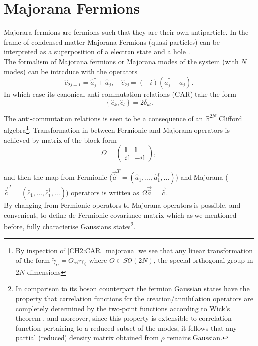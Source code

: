 \section{Majorana Fermions}
Majorara fermions are fermions such that they are their own antiparticle. In the frame of condensed matter Majorana Fermions (quasi-particles) can be interpreted as a superposition of a electron state and a hole \cite{leijnse_introduction_2012}.
\\
The formalism of Majorana fermions or Majorana modes of the system (with $N$ modes) can be introduce with the operators
\begin{equation}
\hat{c}_{2j-1}=\hat{a}_{j}^{\dagger}+\hat{a}_{j}, \quad \hat{c}_{2j}=(-i)\left(a_{j}^{\dagger}-a_{j}\right).
\label{CH2:majorana}
\end{equation}
In which case its canonical anti-commutation relations (CAR) take the form
\begin{equation}
\left\{\hat{c}_{k},\hat{c}_{l}\right\}=2 \delta_{k l}.
\label{CH2:CAR_majorana}
\end{equation}

The anti-commutation relations is seen to be a consequence of an $\mathbb{R}^{2N}$ Clifford algebra\footnote{By inspection of \eqref{CH2:CAR_majorana} we see that  any linear transformation of the form $\tilde{\gamma}_{\alpha} = O_{\alpha\beta}\gamma_{\beta}$ where $O\in SO(2N)$, the special orthogonal group in $2N$  dimensions}. Transformation in between Fermionic and Majorana operators is achieved by matrix of the block form
\begin{equation}
\Omega=\left(\begin{array}{cc}
\mathbb{I} & \mathbb{I} \\
i \mathbb{I} & -i \mathbb{I}
\end{array}\right),
\end{equation}

and then the map from Fermionic ($\vec{\hat{a}}^{T} = (\hat{a}_1,\ldots,\hat{a}_1^{\dagger},\ldots)$) and Majorana ($\vec{\hat{c}}^{T} = (\hat{c}_1,\ldots,\hat{c}_1^{\dagger},\ldots)$) operators is written as $\Omega\vec{\hat{a}}=\vec{\hat{c}}$.
\\
By changing from Fermionic operators to Majorana operators is possible, and convenient, to define de Fermionic covariance matrix which as we mentioned before, fully characterise Gaussians states\footnote{In comparison to its boson counterpart the fermion Gaussian states have the property that correlation functions for the creation/annihilation operators are completely determined by the two-point functions according to Wick’s theorem \cite{westwanski_general_1973}, and moreover,  since this property is extensible to correlation function pertaining to a reduced subset of the modes, it follows that any partial (reduced) density matrix obtained from $\rho$ remains Gaussian.}.

